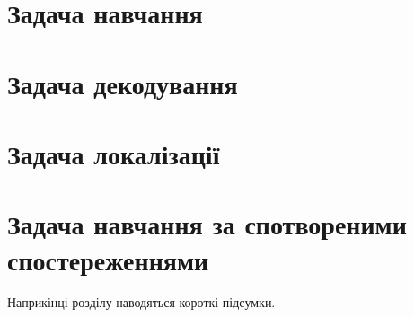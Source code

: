 


\section{Задача навчання}

\section{Задача декодування}

\section{Задача локалізації}

\section{Задача навчання за спотвореними спостереженнями}

\chapconclude{\ref{chap: theory}}

Наприкінці розділу наводяться короткі підсумки.
